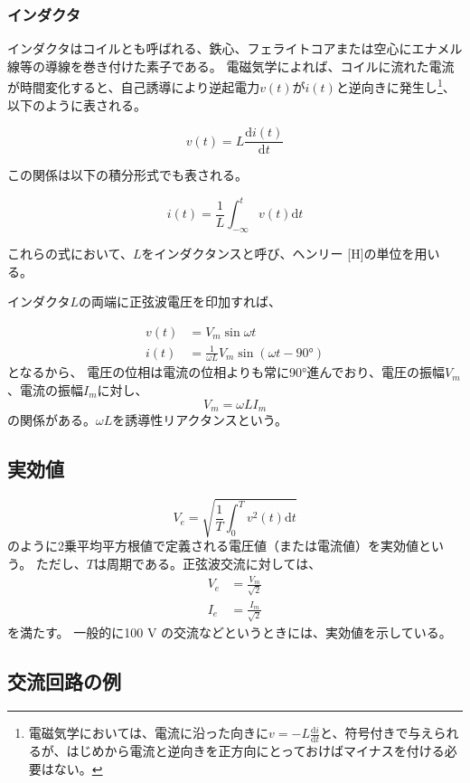 \documentclass{ltjsreport}
\newcommand{\diff}{\mathrm{d}}
\newcommand{\dft}[1]{\frac{\mathrm{d}#1}{\mathrm{d}t}}
\begin{document}
\subsubsection{インダクタ}
インダクタはコイルとも呼ばれる、鉄心、フェライトコアまたは空心にエナメル線等の導線を巻き付けた素子である。
電磁気学によれば、コイルに流れた電流が時間変化すると、自己誘導により逆起電力$v(t)$が$i(t)$と逆向きに発生し\footnote{電磁気学においては、電流に沿った向きに$v = -L\dft{i}$と、符号付きで与えられるが、はじめから電流と逆向きを正方向にとっておけばマイナスを付ける必要はない。}、以下のように表される。


\begin{equation}
  v(t) = L \dft{i(t)}
\end{equation}

この関係は以下の積分形式でも表される。

\begin{equation}
  i(t) = \frac{1}{L}\int_{-\infty}^{t} v(t)\diff t
\end{equation}

これらの式において、$L$をインダクタンスと呼び、ヘンリー [H]の単位を用いる。

インダクタ$L$の両端に正弦波電圧を印加すれば、


\begin{align}
  v(t) &= V_m \sin \omega t\\
  i(t) &= \frac{1}{\omega L} V_m \sin(\omega t - \ang{90})
\end{align}
となるから、
電圧の位相は電流の位相よりも常に\ang{90}進んでおり、電圧の振幅$V_m$、電流の振幅$I_m$に対し、
\[
  V_m = \omega L I_m
\]
の関係がある。$\omega L$を誘導性リアクタンスという。

\subsection{実効値}

\[
  V_e = \sqrt{\frac{1}{T}\int_{0}^{T} v^2(t) \diff t}
\]
のように2乗平均平方根値で定義される電圧値（または電流値）を実効値という。
ただし、$T$は周期である。正弦波交流に対しては、
\begin{align}
  V_e &= \frac{V_m}{\sqrt{2}}\\
  I_e &= \frac{I_m}{\sqrt{2}}
\end{align}
を満たす。
一般的に100 V の交流などというときには、実効値を示している。

\newcommand{\vsin}{V_m \sin(\omega t + \theta)}
\newcommand{\isin}{I_m \sin(\omega t + \theta)}
\subsection{交流回路の例}
\end{document}
